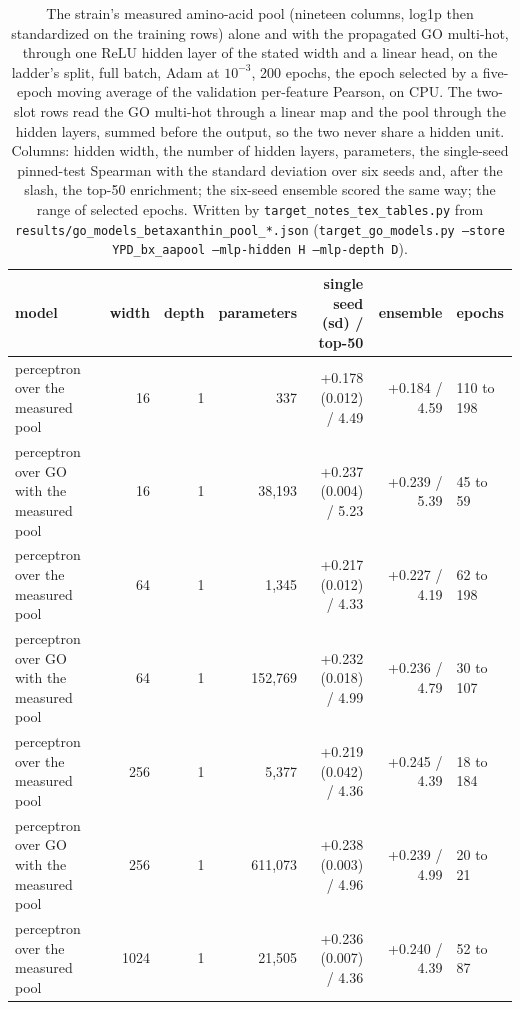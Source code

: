 \begin{table}[H]
  \centering
  \footnotesize
  \caption[The measured pool through a perceptron, by hidden width]{The strain's measured amino-acid pool (nineteen columns, log1p then standardized on the training rows) alone and with the propagated GO multi-hot, through one ReLU hidden layer of the stated width and a linear head, on the ladder's split, full batch, Adam at $10^{-3}$, 200 epochs, the epoch selected by a five-epoch moving average of the validation per-feature Pearson, on CPU. The two-slot rows read the GO multi-hot through a linear map and the pool through the hidden layers, summed before the output, so the two never share a hidden unit. Columns: hidden width, the number of hidden layers, parameters, the single-seed pinned-test Spearman with the standard deviation over six seeds and, after the slash, the top-50 enrichment; the six-seed ensemble scored the same way; the range of selected epochs. Written by \texttt{target\_notes\_tex\_tables.py} from \texttt{results/go\_models\_betaxanthin\_pool\_*.json} (\texttt{target\_go\_models.py --store YPD\_bx\_aapool --mlp-hidden H --mlp-depth D}).}
  \label{tab:pool-mlp-sweep}
  \begin{tabular}{@{}lrrrrrl@{}}
    \hline
    model & width & depth & parameters & single seed (sd) / top-50 & ensemble & epochs \\
    \hline
    perceptron over the measured pool & 16 & 1 & 337 & +0.178 (0.012) / 4.49 & +0.184 / 4.59 & 110 to 198 \\
    perceptron over GO with the measured pool & 16 & 1 & 38,193 & +0.237 (0.004) / 5.23 & +0.239 / 5.39 & 45 to 59 \\
    perceptron over the measured pool & 64 & 1 & 1,345 & +0.217 (0.012) / 4.33 & +0.227 / 4.19 & 62 to 198 \\
    perceptron over GO with the measured pool & 64 & 1 & 152,769 & +0.232 (0.018) / 4.99 & +0.236 / 4.79 & 30 to 107 \\
    perceptron over the measured pool & 256 & 1 & 5,377 & +0.219 (0.042) / 4.36 & +0.245 / 4.39 & 18 to 184 \\
    perceptron over GO with the measured pool & 256 & 1 & 611,073 & +0.238 (0.003) / 4.96 & +0.239 / 4.99 & 20 to 21 \\
    perceptron over the measured pool & 1024 & 1 & 21,505 & +0.236 (0.007) / 4.36 & +0.240 / 4.39 & 52 to 87 \\

\end{tabular}
\end{table}
